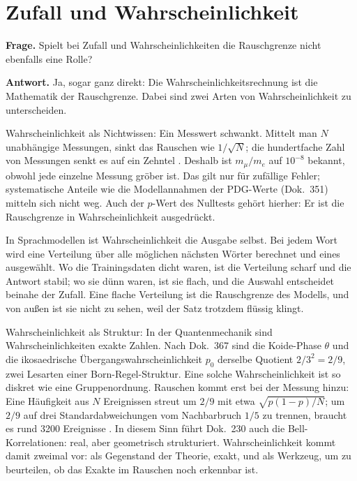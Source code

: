 \section{Zufall und Wahrscheinlichkeit}

\textbf{Frage.} Spielt bei Zufall und Wahrscheinlichkeiten die Rauschgrenze nicht ebenfalls eine
Rolle?

\textbf{Antwort.} Ja, sogar ganz direkt: Die Wahrscheinlichkeitsrechnung ist die Mathematik der
Rauschgrenze. Dabei sind zwei Arten von Wahrscheinlichkeit zu unterscheiden.

Wahrscheinlichkeit als Nichtwissen: Ein Messwert schwankt. Mittelt man $N$ unabhängige Messungen,
sinkt das Rauschen wie $1/\sqrt N$; die hundertfache Zahl von Messungen senkt es auf ein Zehntel \BM.
Deshalb ist $m_\mu/m_e$ auf $10^{-8}$ bekannt, obwohl jede einzelne Messung gröber ist. Das gilt nur
für zufällige Fehler; systematische Anteile wie die Modellannahmen der PDG-Werte (Dok.~351) mitteln
sich nicht weg. Auch der $p$-Wert des Nulltests gehört hierher: Er ist die Rauschgrenze in
Wahrscheinlichkeit ausgedrückt.

In Sprachmodellen ist Wahrscheinlichkeit die Ausgabe selbst. Bei jedem Wort wird eine Verteilung über
alle möglichen nächsten Wörter berechnet und eines ausgewählt. Wo die Trainingsdaten dicht waren, ist
die Verteilung scharf und die Antwort stabil; wo sie dünn waren, ist sie flach, und die Auswahl
entscheidet beinahe der Zufall. Eine flache Verteilung ist die Rauschgrenze des Modells, und von
außen ist sie nicht zu sehen, weil der Satz trotzdem flüssig klingt.

Wahrscheinlichkeit als Struktur: In der Quantenmechanik sind Wahrscheinlichkeiten exakte Zahlen. Nach
Dok.~367 sind die Koide-Phase $\theta$ und die ikosaedrische Übergangswahrscheinlichkeit $p_0$
derselbe Quotient $2/3^2=2/9$, zwei Lesarten einer Born-Regel-Struktur. Eine solche Wahrscheinlichkeit
ist so diskret wie eine Gruppenordnung. Rauschen kommt erst bei der Messung hinzu: Eine Häufigkeit
aus $N$ Ereignissen streut um $2/9$ mit etwa $\sqrt{p(1-p)/N}$; um $2/9$ auf drei Standardabweichungen
vom Nachbarbruch $1/5$ zu trennen, braucht es rund 3200 Ereignisse \KM. In diesem Sinn führt
Dok.~230 auch die Bell-Korrelationen: real, aber geometrisch strukturiert. Wahrscheinlichkeit kommt
damit zweimal vor: als Gegenstand der Theorie, exakt, und als Werkzeug, um zu beurteilen, ob das
Exakte im Rauschen noch erkennbar ist.

